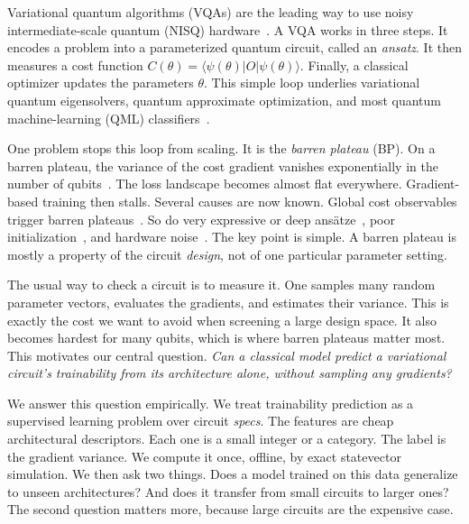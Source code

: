\documentclass[aps,pra,preprint,amsmath,amssymb,floatfix,nofootinbib]{revtex4-2}
\begin{document}
Variational quantum algorithms (VQAs) are the leading way to use noisy
intermediate-scale quantum (NISQ) hardware~\cite{cerezo2021vqa}. A VQA works in
three steps. It encodes a problem into a parameterized quantum circuit, called an
\emph{ansatz}. It then measures a cost function
$C(\theta)=\langle\psi(\theta)|O|\psi(\theta)\rangle$. Finally, a classical
optimizer updates the parameters $\theta$. This simple loop underlies variational
quantum eigensolvers, quantum approximate optimization, and most quantum
machine-learning (QML) classifiers~\cite{havlicek2019supervised,
farhi2018classification,schuld2020circuit}.

One problem stops this loop from scaling. It is the \emph{barren plateau} (BP).
On a barren plateau, the variance of the cost gradient vanishes exponentially in
the number of qubits~\cite{mcclean2018barren,larocca2025barren}. The loss
landscape becomes almost flat everywhere. Gradient-based training then stalls.
Several causes are now known. Global cost observables trigger barren
plateaus~\cite{cerezo2021cost}. So do very expressive or deep
ans\"atze~\cite{holmes2022expressibility}, poor
initialization~\cite{grant2019initialization}, and hardware
noise~\cite{wang2021noise}. The key point is simple. A barren plateau is mostly a
property of the circuit \emph{design}, not of one particular parameter setting.

The usual way to check a circuit is to measure it. One samples many random
parameter vectors, evaluates the gradients, and estimates their variance. This is
exactly the cost we want to avoid when screening a large design space. It also
becomes hardest for many qubits, which is where barren plateaus matter most. This
motivates our central question. \emph{Can a classical model predict a variational
circuit's trainability from its architecture alone, without sampling any
gradients?}

We answer this question empirically. We treat trainability prediction as a
supervised learning problem over circuit \emph{specs}. The features are cheap
architectural descriptors. Each one is a small integer or a category. The label
is the gradient variance. We compute it once, offline, by exact statevector
simulation. We then ask two things. Does a model trained on this data generalize
to unseen architectures? And does it transfer from small circuits to larger ones?
The second question matters more, because large circuits are the expensive case.
\end{document}
